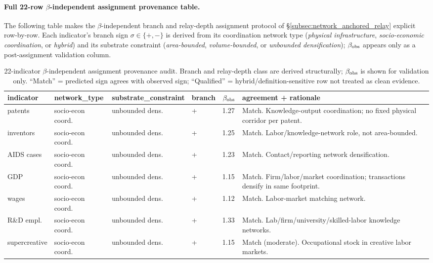 \paragraph{Full 22-row \(\beta\)-independent assignment provenance table.}
The following table makes the \(\beta\)-independent branch and relay-depth assignment protocol of \S\ref{subsec:network_anchored_relay} explicit row-by-row. Each indicator's branch sign \(\sigma\in\{+,-\}\) is derived from its coordination network type (\textit{physical infrastructure}, \textit{socio-economic coordination}, or \textit{hybrid}) and its substrate constraint (\textit{area-bounded}, \textit{volume-bounded}, or \textit{unbounded densification}); \(\beta_{\rm obs}\) appears only as a post-assignment validation column.

\begin{table}[h]
\centering
\footnotesize
\caption{22-indicator \(\beta\)-independent assignment provenance audit. Branch and relay-depth class are derived structurally; \(\beta_{\rm obs}\) is shown for validation only. ``Match'' = predicted sign agrees with observed sign; ``Qualified'' = hybrid/definition-sensitive row not treated as clean evidence.}
\label{tab:beta_independent_assignment}
\setlength{\tabcolsep}{2pt}
\renewcommand{\arraystretch}{0.95}
\begin{tabular}{p{1.6cm}p{2.2cm}p{2.7cm}>{\centering\arraybackslash}p{1.5cm}p{1.25cm}p{6.75cm}}
\toprule
indicator & network\_type & substrate\_constraint & branch & \(\beta_{\rm obs}\) & agreement + rationale \\
\midrule
patents & socio-econ coord. & unbounded dens. & + & 1.27 & Match. Knowledge-output coordination; no fixed physical corridor per patent. \\
inventors & socio-econ coord. & unbounded dens. & + & 1.25 & Match. Labor/knowledge-network role, not area-bounded. \\
AIDS cases & socio-econ coord. & unbounded dens. & + & 1.23 & Match. Contact/reporting network densification. \\
GDP & socio-econ coord. & unbounded dens. & + & 1.15 & Match. Firm/labor/market coordination; transactions densify in same footprint. \\
wages & socio-econ coord. & unbounded dens. & + & 1.12 & Match. Labor-market matching network. \\
R\&D empl. & socio-econ coord. & unbounded dens. & + & 1.33 & Match. Lab/firm/university/skilled-labor knowledge networks. \\
supercreative & socio-econ coord. & unbounded dens. & + & 1.15 & Match (moderate). Occupational stock in creative labor markets. \\

\end{tabular}
\end{table}
